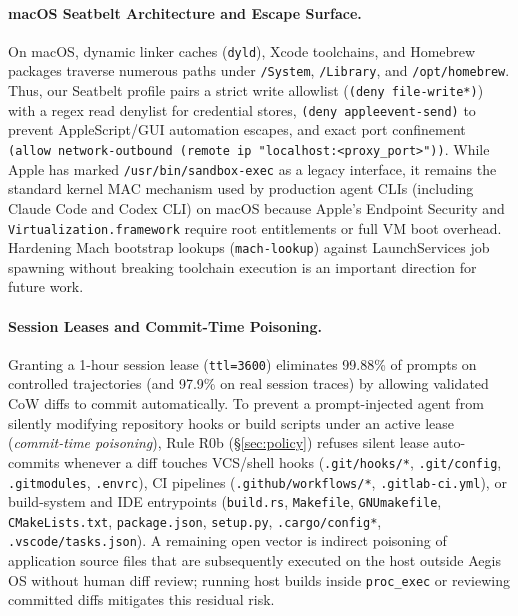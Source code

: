 \documentclass[acmsmall,screen,review]{acmart}
\begin{document}
\paragraph{macOS Seatbelt Architecture and Escape Surface.} On macOS, dynamic linker caches (\texttt{dyld}), Xcode toolchains, and Homebrew packages traverse numerous paths under \texttt{/System}, \texttt{/Library}, and \texttt{/opt/homebrew}. Thus, our Seatbelt profile pairs a strict write allowlist (\texttt{(deny file-write*)}) with a regex read denylist for credential stores, \texttt{(deny appleevent-send)} to prevent AppleScript/GUI automation escapes, and exact port confinement \texttt{(allow network-outbound (remote ip "localhost:<proxy\_port>"))}. While Apple has marked \texttt{/usr/bin/sandbox-exec} as a legacy interface, it remains the standard kernel MAC mechanism used by production agent CLIs (including Claude Code and Codex CLI) on macOS because Apple's Endpoint Security and \texttt{Virtualization.framework} require root entitlements or full VM boot overhead. Hardening Mach bootstrap lookups (\texttt{mach-lookup}) against LaunchServices job spawning without breaking toolchain execution is an important direction for future work.

\paragraph{Session Leases and Commit-Time Poisoning.} Granting a 1-hour session lease (\texttt{ttl=3600}) eliminates 99.88\% of prompts on controlled trajectories (and 97.9\% on real session traces) by allowing validated CoW diffs to commit automatically. To prevent a prompt-injected agent from silently modifying repository hooks or build scripts under an active lease (\emph{commit-time poisoning}), Rule R0b (\S\ref{sec:policy}) refuses silent lease auto-commits whenever a diff touches VCS/shell hooks (\texttt{.git/hooks/*}, \texttt{.git/config}, \texttt{.gitmodules}, \texttt{.envrc}), CI pipelines (\texttt{.github/workflows/*}, \texttt{.gitlab-ci.yml}), or build-system and IDE entrypoints (\texttt{build.rs}, \texttt{Makefile}, \texttt{GNUmakefile}, \texttt{CMakeLists.txt}, \texttt{package.json}, \texttt{setup.py}, \texttt{.cargo/config*}, \texttt{.vscode/tasks.json}). A remaining open vector is indirect poisoning of application source files that are subsequently executed on the host outside Aegis OS without human diff review; running host builds inside \texttt{proc\_exec} or reviewing committed diffs mitigates this residual risk.
\end{document}
